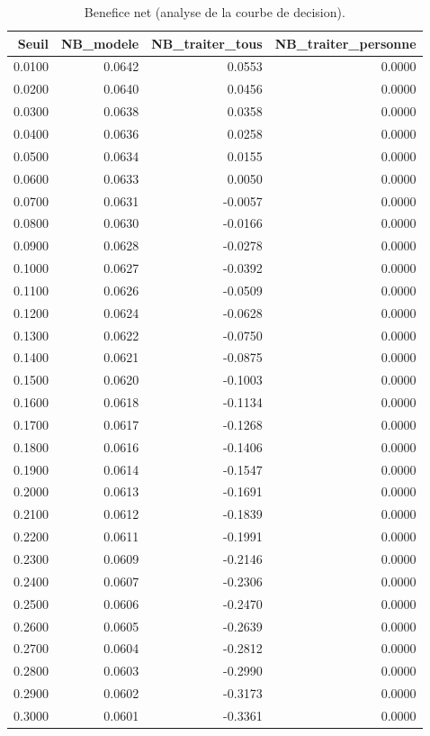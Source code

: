 \begin{table}
\caption{Benefice net (analyse de la courbe de decision).}
\label{tab:dca}
\begin{tabular}{rrrr}
\toprule
Seuil & NB_modele & NB_traiter_tous & NB_traiter_personne \\
\midrule
0.0100 & 0.0642 & 0.0553 & 0.0000 \\
0.0200 & 0.0640 & 0.0456 & 0.0000 \\
0.0300 & 0.0638 & 0.0358 & 0.0000 \\
0.0400 & 0.0636 & 0.0258 & 0.0000 \\
0.0500 & 0.0634 & 0.0155 & 0.0000 \\
0.0600 & 0.0633 & 0.0050 & 0.0000 \\
0.0700 & 0.0631 & -0.0057 & 0.0000 \\
0.0800 & 0.0630 & -0.0166 & 0.0000 \\
0.0900 & 0.0628 & -0.0278 & 0.0000 \\
0.1000 & 0.0627 & -0.0392 & 0.0000 \\
0.1100 & 0.0626 & -0.0509 & 0.0000 \\
0.1200 & 0.0624 & -0.0628 & 0.0000 \\
0.1300 & 0.0622 & -0.0750 & 0.0000 \\
0.1400 & 0.0621 & -0.0875 & 0.0000 \\
0.1500 & 0.0620 & -0.1003 & 0.0000 \\
0.1600 & 0.0618 & -0.1134 & 0.0000 \\
0.1700 & 0.0617 & -0.1268 & 0.0000 \\
0.1800 & 0.0616 & -0.1406 & 0.0000 \\
0.1900 & 0.0614 & -0.1547 & 0.0000 \\
0.2000 & 0.0613 & -0.1691 & 0.0000 \\
0.2100 & 0.0612 & -0.1839 & 0.0000 \\
0.2200 & 0.0611 & -0.1991 & 0.0000 \\
0.2300 & 0.0609 & -0.2146 & 0.0000 \\
0.2400 & 0.0607 & -0.2306 & 0.0000 \\
0.2500 & 0.0606 & -0.2470 & 0.0000 \\
0.2600 & 0.0605 & -0.2639 & 0.0000 \\
0.2700 & 0.0604 & -0.2812 & 0.0000 \\
0.2800 & 0.0603 & -0.2990 & 0.0000 \\
0.2900 & 0.0602 & -0.3173 & 0.0000 \\
0.3000 & 0.0601 & -0.3361 & 0.0000 \\

\end{tabular}
\end{table}
